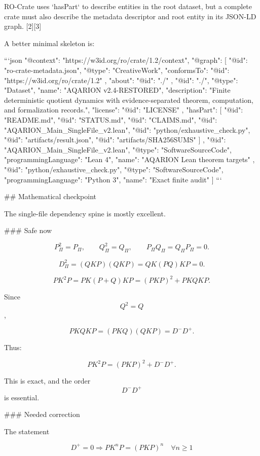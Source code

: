 RO-Crate uses `hasPart` to describe entities in the root dataset, but a complete crate must also describe the metadata descriptor and root entity in its JSON-LD graph. [2][3]

A better minimal skeleton is:

```json
{
  "@context": "https://w3id.org/ro/crate/1.2/context",
  "@graph": [
    {
      "@id": "ro-crate-metadata.json",
      "@type": "CreativeWork",
      "conformsTo": {
        "@id": "https://w3id.org/ro/crate/1.2"
      },
      "about": {
        "@id": "./"
      }
    },
    {
      "@id": "./",
      "@type": "Dataset",
      "name": "AQARION v2.4-RESTORED",
      "description": "Finite deterministic quotient dynamics with evidence-separated theorem, computation, and formalization records.",
      "license": {
        "@id": "LICENSE"
      },
      "hasPart": [
        {"@id": "README.md"},
        {"@id": "STATUS.md"},
        {"@id": "CLAIMS.md"},
        {"@id": "AQARION_Main_SingleFile_v2.lean"},
        {"@id": "python/exhaustive_check.py"},
        {"@id": "artifacts/result.json"},
        {"@id": "artifacts/SHA256SUMS"}
      ]
    },
    {
      "@id": "AQARION_Main_SingleFile_v2.lean",
      "@type": "SoftwareSourceCode",
      "programmingLanguage": "Lean 4",
      "name": "AQARION Lean theorem targets"
    },
    {
      "@id": "python/exhaustive_check.py",
      "@type": "SoftwareSourceCode",
      "programmingLanguage": "Python 3",
      "name": "Exact finite audit"
    }
  ]
}
```

## Mathematical checkpoint

The single-file dependency spine is mostly excellent.

### Safe now

$$
P_\Pi^2=P_\Pi,
\qquad
Q_\Pi^2=Q_\Pi,
\qquad
P_\Pi Q_\Pi=Q_\Pi P_\Pi=0.
$$

$$
D_\Pi^2
=
(QKP)(QKP)
=
QK(PQ)KP
=
0.
$$

$$
PK^2P
=
PK(P+Q)KP
=
(PKP)^2
+
PKQKP.
$$

Since $$Q^2=Q$$,

$$
PKQKP
=
(PKQ)(QKP)
=
D^-D^+.
$$

Thus:

$$
\boxed{
PK^2P=(PKP)^2+D^-D^+.
}
$$

This is exact, and the order $$D^-D^+$$ is essential.

### Needed correction

The statement

$$
D^+=0
\Longrightarrow
PK^nP=(PKP)^n
\quad
\forall n\ge1
$$

